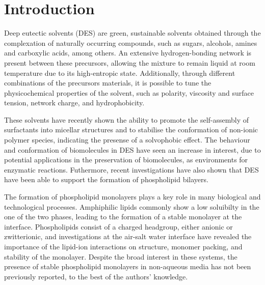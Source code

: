 \documentclass[twoside,twocolumn,9pt]{article}
\begin{document}

\section{Introduction}
Deep eutectic solvents (DES) are green, sustainable solvents obtained through the complexation of naturally occurring compounds, such as sugars, alcohols, amines and carboxylic acids, among others.\cite{Smith2014, Dai2013} An extensive hydrogen-bonding network is present between these precursors, allowing the mixture to remain liquid at room temperature due to its high-entropic state.\cite{Hammond2016, Hammond2017, Araujo2017} Additionally, through different combinations of the precursors materials, it is possible to tune the physicochemical properties of the solvent, such as polarity,\cite{Pandey2014} viscosity and surface tension,\cite{Smith2014} network charge,\cite{Zahn2016} and hydrophobicity.\cite{Ribeiro2015,vanOsch2015} 

These solvents have recently shown the ability to promote the self-assembly of surfactants into micellar structures\cite{Sanchez-Fernandez2016,Arnold2015} and to stabilise the conformation of non-ionic polymer species,\cite{Sapir2016} indicating the presense of a solvophobic effect. The behaviour and conformation of biomolecules in DES have seen an increase in interest,\cite{Esquembre2013,Gorke2010,Gorke2008,Monhami2014,Wu2014,Harifi-Mood2017,Milano2017,Sanchez-Fernandez2017} due to potential applications in the preservation of biomolecules, as environments for enzymatic reactions.\cite{Merza2018} Futhermore, recent investigations have also shown that DES have been able to support the formation of phospholipid bilayers.\cite{Bryant2017,Bryant2016,Gutierrez2009} 

The formation of phospholipid monolayers plays a key role in many biological and technological processes. Amphiphilic lipids commonly show a low soluibilty in the one of the two phases, leading to the formation of a stable monolayer at the interface.\cite{Mohwald1990} Phospholipids consist of a charged headgroup, either anionic or zwitterionic, and investigations at the air-salt water interface have revealed the importance of the lipid-ion interactions on structure, monomer packing, and stability of the monolayer.\cite{Mohwald1990,Kewalramani2010} Despite the broad interest in these systems, the presence of stable phospholipid monolayers in non-aqueous media has not been previously reported, to the best of the authors' knowledge. 
\end{document}

